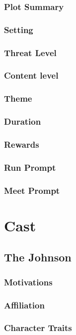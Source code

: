 \documentclass{ShadowTeXSR5}
\begin{document}
\subsubsection{Plot Summary}
\lipsum[1]
\subsubsection{Setting}
\lipsum[1]
\subsubsection{Threat Level}
\lipsum[1]
\subsubsection{Content level}
\lipsum[1]
\subsubsection{Theme}
\lipsum[1]
\subsubsection{Duration}
\lipsum[1]
\subsubsection{Rewards}
\lipsum[1]
\subsubsection{Run Prompt}
\lipsum[1]
\subsubsection{Meet Prompt}
\lipsum[1]

\section{Cast}
\lipsum[1]
\subsection{The Johnson}
\lipsum[1]
\subsubsection{Motivations}
\lipsum[1]
\subsubsection{Affiliation}
\lipsum[1]
\subsubsection{Character Traits}
\lipsum[1]
\end{document}
